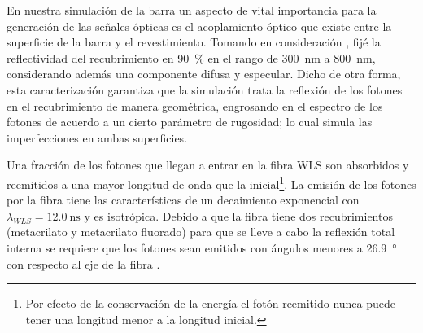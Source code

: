 En nuestra simulación de la barra un aspecto de vital importancia para la generación de las señales ópticas es el acoplamiento óptico que existe entre la superficie de la barra y el revestimiento. Tomando en consideración \cite{dietz16,gros18}, fijé la reflectividad del recubrimiento en \SI{90}{\percent} en el rango de \SI{300}{\nano\metre} a \SI{800}{\nano\metre}, considerando además una componente difusa y especular. Dicho de otra forma, esta caracterización garantiza que la simulación trata la reflexión de los fotones en el recubrimiento de manera geométrica, engrosando en el espectro de los fotones de acuerdo a un cierto parámetro de rugosidad; lo cual simula las imperfecciones en ambas superficies.

Una fracción de los fotones que llegan a entrar en la fibra WLS son absorbidos y reemitidos a una mayor longitud de onda que la inicial\footnote{Por efecto de la conservación de la energía el fotón reemitido nunca puede tener una longitud menor a la longitud inicial.}. La emisión de los fotones por la fibra tiene las características de un decaimiento exponencial con $\lambda_{WLS}=\SI{12.0}{\nano\second}$ y es isotrópica. Debido a que la fibra tiene dos recubrimientos (metacrilato y metacrilato fluorado) para que se lleve a cabo la reflexión total interna se requiere que los fotones sean emitidos con ángulos menores a \SI{26.9}{\degree} con respecto al eje de la fibra \cite{kikawa14}.

